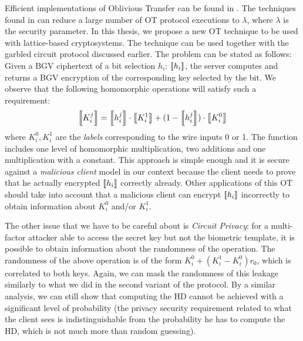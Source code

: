Efficient implementations of Oblivious Transfer can be found in
\cite{naor2001efficient35}. The techniques found in \cite{ishai2003extending24}
can reduce a large number of OT protocol executions to \(\lambda\), where
\(\lambda\) is the security parameter. In this thesis, we propose a new OT
technique to be used with lattice-based cryptosystems. The technique can be used
together with the garbled circuit protocol discussed earlier. The problem can be
stated as follows: Given a BGV ciphertext of a bit selection \(h_{i}\):
\(\left\llbracket h_{i}\right\rrbracket\), the server computes and returns a BGV encryption of the
corresponding key selected by the bit. We observe that the following homomorphic
operations will satisfy such a requirement:
\[
\left\llbracket K_{i}^{j}\right\rrbracket = \left\llbracket h_{i}^{j}\right\rrbracket \cdot \left\llbracket K_{i}^{1}\right\rrbracket + (1 - \left\llbracket h_{i}^{j}\right\rrbracket) \cdot \left\llbracket K_{i}^{0}\right\rrbracket
\]
where \(K_{i}^{0}, K_{i}^{1}\) are the \textit{labels} corresponding to the wire
inputs 0 or 1. The function includes one level of homomorphic multiplication, two
additions and one multiplication with a constant. This approach is simple enough
and it is secure against a \textit{malicious client} model in our context because
the client needs to prove that he actually encrypted \(\left\llbracket h_{i}\right\rrbracket\)
correctly already. Other applications of this OT should take into account that a
malicious client can encrypt \(\left\llbracket h_{i}\right\rrbracket\) incorrectly to obtain information about
\(K_{i}^{0}\) and/or \(K_{i}^{1}\).

The other issue that we have to be careful about is \textit{Circuit Privacy}:
for a multi-factor attacker able to access the secret key but not the
biometric template, it is possible to obtain information about the randomness of the
operation. The randomness of the above operation is of the form
\(K_{i}^{0} + (K_{i}^{1} - K_{i}^{0})r_{0}\), which is correlated to both
keys. Again, we can mask the randomness of this leakage similarly to what we did
in the second variant of the protocol. By a similar analysis, we can still show
that computing the HD cannot be achieved with a significant level of probability (the privacy
security requirement related to what the client sees is indistinguishable
from the probability he has to compute the HD, which is not much more than random
guessing).

